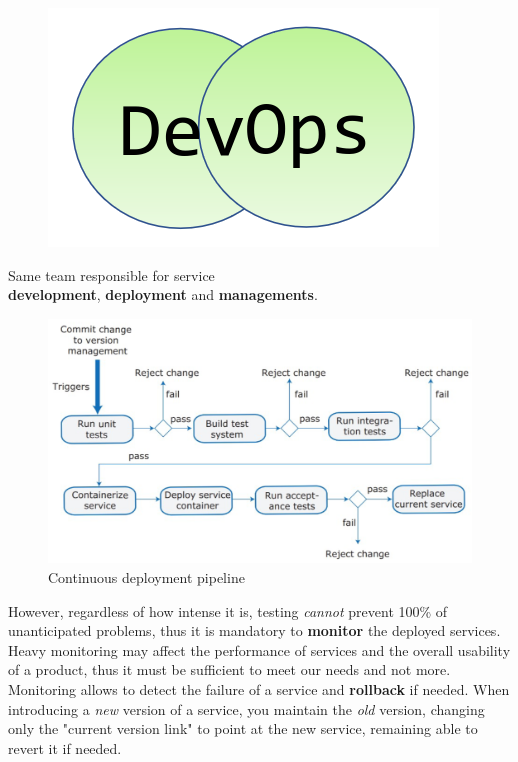 \begin{figure}[htbp]
   \centering
   \includegraphics[width=0.2\columnwidth]{images/devops.png}
   \label{fig:devops}
\end{figure}
\begin{center}
   Same team responsible for service\\
   \textbf{development}, \textbf{deployment} and \textbf{managements}.
\end{center}

\begin{figure}[htbp]
   \centering
   \includegraphics{images/devops_pipeline.png}
   \caption{Continuous deployment pipeline}
   \label{fig:devops_pipeline}
\end{figure}

However, regardless of how intense it is, testing \textit{cannot} prevent 100\% of unanticipated problems,
thus it is mandatory to \textbf{monitor} the deployed services.
Heavy monitoring may affect the performance of services and the overall usability of a product,
thus it must be sufficient to meet our needs and not more.\\
Monitoring allows to detect the failure of a service and \textbf{rollback} if needed.
When introducing a \textit{new} version of a service, you maintain the \textit{old} version,
changing only the "current version link" to point at the new service,
remaining able to revert it if needed.

